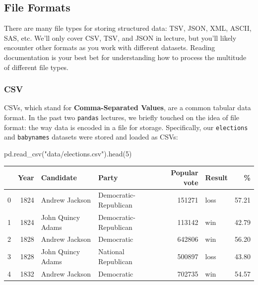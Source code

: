 \documentclass[
  letterpaper,
  DIV=11,
  numbers=noendperiod]{scrreprt}
\newenvironment{Shaded}{\begin{snugshade}}{\end{snugshade}}
\newcommand{\DecValTok}[1]{\textcolor[rgb]{0.68,0.00,0.00}{#1}}
\newcommand{\NormalTok}[1]{\textcolor[rgb]{0.00,0.23,0.31}{#1}}
\newcommand{\StringTok}[1]{\textcolor[rgb]{0.13,0.47,0.30}{#1}}
\begin{document}
\hypertarget{file-formats}{%
\subsection{File Formats}\label{file-formats}}

There are many file types for storing structured data: TSV, JSON, XML,
ASCII, SAS, etc. We'll only cover CSV, TSV, and JSON in lecture, but
you'll likely encounter other formats as you work with different
datasets. Reading documentation is your best bet for understanding how
to process the multitude of different file types.

\hypertarget{csv}{%
\subsubsection{CSV}\label{csv}}

CSVs, which stand for \textbf{Comma-Separated Values}, are a common
tabular data format. In the past two \texttt{pandas} lectures, we
briefly touched on the idea of file format: the way data is encoded in a
file for storage. Specifically, our \texttt{elections} and
\texttt{babynames} datasets were stored and loaded as CSVs:

\begin{Shaded}
\begin{Highlighting}[]
\NormalTok{pd.read\_csv(}\StringTok{"data/elections.csv"}\NormalTok{).head(}\DecValTok{5}\NormalTok{)}
\end{Highlighting}
\end{Shaded}

\begin{tabular}{lrllrlr}
\toprule
{} &  Year &          Candidate &                  Party &  Popular vote & Result &     \% \\
\midrule
0 &  1824 &     Andrew Jackson &  Democratic-Republican &        151271 &   loss & 57.21 \\
1 &  1824 &  John Quincy Adams &  Democratic-Republican &        113142 &    win & 42.79 \\
2 &  1828 &     Andrew Jackson &             Democratic &        642806 &    win & 56.20 \\
3 &  1828 &  John Quincy Adams &    National Republican &        500897 &   loss & 43.80 \\
4 &  1832 &     Andrew Jackson &             Democratic &        702735 &    win & 54.57 \\
\bottomrule
\end{tabular}
\end{document}
